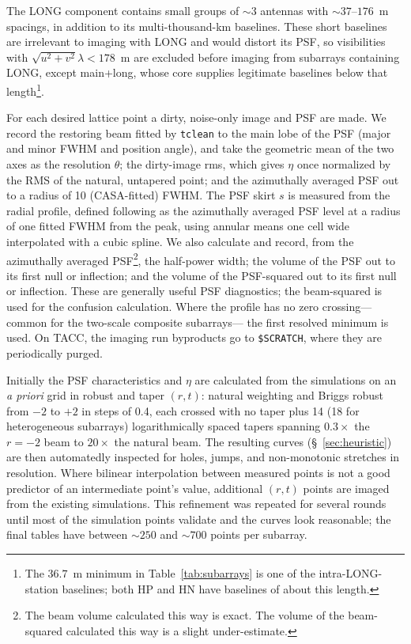 \documentclass[11pt]{article}
\begin{document}
The LONG component contains small groups of $\sim 3$ antennas with
$\sim 37$--$176$~m spacings, in addition to its multi-thousand-km
baselines.  These short baselines are irrelevant to imaging with LONG
and would distort its PSF, so visibilities with $\sqrt{u^2 + v^2}
\lambda < 178$~m are excluded before imaging from subarrays containing
LONG, except main+long, whose core supplies legitimate baselines below
that length\footnote{The $36.7$~m minimum in Table~\ref{tab:subarrays}
is one of the intra-LONG-station baselines; both HP and HN have
baselines of about this length.}.

For each desired lattice point a dirty, noise-only image and PSF are
made.  We record the restoring beam fitted by {\tt tclean} to the main
lobe of the PSF (major and minor FWHM and position angle), and take
the geometric mean of the two axes as the resolution $\theta$; the
dirty-image rms, which gives $\eta$ once normalized by the RMS of the
natural, untapered point; and the azimuthally averaged PSF out to a
radius of 10 (CASA-fitted) FWHM. The PSF skirt $s$ is measured from
the radial profile, defined following \citep{memo65} as the
azimuthally averaged PSF level at a radius of one fitted FWHM from the
peak, using annular means one cell wide interpolated with a cubic
spline. We also calculate and record, from the azimuthally averaged
PSF\footnote{The beam volume calculated this way is exact. The volume
of the beam-squared calculated this way is a slight under-estimate.},
the half-power width; the volume of the PSF out to its first null or
inflection; and the volume of the PSF-squared out to its first null or
inflection. These are generally useful PSF diagnostics; the
beam-squared is used for the confusion calculation. Where the profile
has no zero crossing--- common for the two-scale composite
subarrays--- the first resolved minimum is used.  On TACC, the imaging
run byproducts go to {\tt \$SCRATCH}, where they are periodically
purged.

Initially the PSF characteristics and $\eta$ are calculated from the
simulations on an {\it a priori} grid in robust and taper $(r,t)$:
natural weighting and Briggs robust from $-2$ to $+2$ in steps of 0.4,
each crossed with no taper plus 14 (18 for heterogeneous subarrays)
logarithmically spaced tapers spanning $0.3\times$ the $r=-2$ beam to
$20\times$ the natural beam.  The resulting curves
(\S~\ref{sec:heuristic}) are then automatedly inspected for holes,
jumps, and non-monotonic stretches in resolution. Where bilinear
interpolation between measured points is not a good predictor of an
intermediate point's value, additional $(r,t)$ points are imaged from
the existing simulations.  This refinement was repeated for several
rounds until most of the simulation points validate and the curves
look reasonable; the final tables have between $\sim 250$ and
$\sim 700$ points per subarray.
\end{document}

